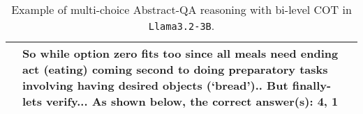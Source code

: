 \begin{table*}[hbt!]
{\begin{tabular}{l|p{12cm}}
& So while option zero fits too since all meals need ending act (eating) coming second to doing preparatory tasks involving having desired objects (`bread').. But finally- lets verify... As shown below, the correct answer(s): 4, 1\\ 
\bottomrule
\end{tabular}%
}
\caption{Example of multi-choice Abstract-QA reasoning with bi-level COT in \texttt{Llama3.2-3B}.}
\label{tab:examples_cot_step}
\end{table*}

